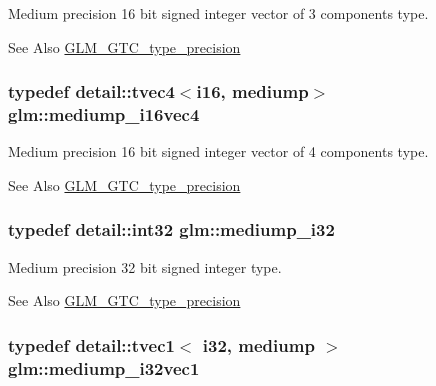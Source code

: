 Medium precision 16 bit signed integer vector of 3 components type. \begin{DoxySeeAlso}{See Also}
\hyperlink{group__gtc__type__precision}{G\-L\-M\-\_\-\-G\-T\-C\-\_\-type\-\_\-precision} 
\end{DoxySeeAlso}
\hypertarget{group__gtc__type__precision_gad9aca299fc3e96c84be6b063381c9f3e}{
\subsubsection[{mediump\-\_\-i16vec4}]{\setlength{\rightskip}{0pt plus 5cm}typedef detail\-::tvec4$<$i16, mediump$>$ {\bf glm\-::mediump\-\_\-i16vec4}}}\label{group__gtc__type__precision_gad9aca299fc3e96c84be6b063381c9f3e}
Medium precision 16 bit signed integer vector of 4 components type. \begin{DoxySeeAlso}{See Also}
\hyperlink{group__gtc__type__precision}{G\-L\-M\-\_\-\-G\-T\-C\-\_\-type\-\_\-precision} 
\end{DoxySeeAlso}
\hypertarget{group__gtc__type__precision_ga5e00ec824eb55968a6b6496f294d8c07}{
\subsubsection[{mediump\-\_\-i32}]{\setlength{\rightskip}{0pt plus 5cm}typedef detail\-::int32 {\bf glm\-::mediump\-\_\-i32}}}\label{group__gtc__type__precision_ga5e00ec824eb55968a6b6496f294d8c07}
Medium precision 32 bit signed integer type. \begin{DoxySeeAlso}{See Also}
\hyperlink{group__gtc__type__precision}{G\-L\-M\-\_\-\-G\-T\-C\-\_\-type\-\_\-precision} 
\end{DoxySeeAlso}
\hypertarget{group__gtc__type__precision_ga44c6a3b78e635d91e35e1c41ab6b0ba1}{
\subsubsection[{mediump\-\_\-i32vec1}]{\setlength{\rightskip}{0pt plus 5cm}typedef detail\-::tvec1$<$ i32, mediump $>$ {\bf glm\-::mediump\-\_\-i32vec1}}}\label{group__gtc__type__precision_ga44c6a3b78e635d91e35e1c41ab6b0ba1}
